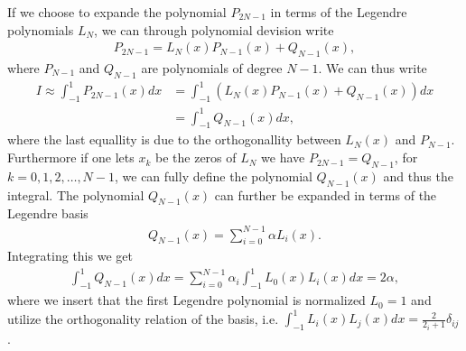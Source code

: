 \documentclass[twocolumn]{aastex62}
\begin{document}
If we choose to expande the polynomial $P_{2N-1}$ in terms of the Legendre polynomials $L_N$, we can through polynomial devision write 
\begin{align}
	P_{2N-1} = L_N(x)P_{N-1}(x) + Q_{N-1}(x),
\end{align}
where $P_{N-1}$ and $Q_{N-1}$ are polynomials of degree $N-1$. We can thus write 
\begin{align}
	I \approx \int^1_{-1} P_{2N-1}(x) dx &= \int^1_{-1} (L_N(x)P_{N-1}(x) + Q_{N-1}(x))dx \\
	&= \int^1_{-1}Q_{N-1}(x)dx,
\end{align}
where the last equallity is due to the orthogonallity between $L_N(x)$ and $P_{N-1}$. Furthermore if one lets $x_k$ be the zeros of $L_N$ we have $P_{2N-1} = Q_{N-1}$, for $k = 0, 1, 2,\ldots, N-1$, we can fully define the polynomial $Q_{N-1}(x)$ and thus the integral. The polynomial $Q_{N-1}(x)$ can further be expanded in terms of the Legendre basis 
\begin{align}
	Q_{N-1}(x) = \sum^{N-1}_{i=0} \alpha L_i(x).
\end{align}
Integrating this we get
\begin{align}
	\int^1_{-1}Q_{N-1}(x)dx = \sum^{N-1}_{i=0} \alpha_i\int^1_{-1}L_0(x)L_i(x) dx = 2\alpha,
\end{align}
where we insert that the first Legendre polynomial is normalized $L_0 = 1$ and utilize the orthogonality relation of the basis, i.e. $\int^1_{-1}L_i(x)L_j(x)dx = \frac{2}{2_i + 1}\delta_{ij}$.
\end{document}
